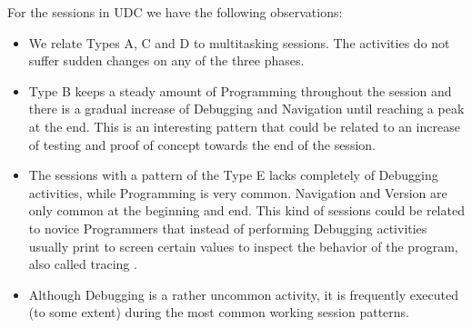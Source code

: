 \documentclass[conference]{IEEEtran}
\begin{document}
For the sessions in UDC we have the following observations:
\begin{itemize}
	\item We relate Types A, C and D to multitasking sessions. The activities do not suffer sudden changes on any of the three phases.
	
	\item Type B keeps a steady amount of Programming throughout the session and there is a gradual increase of Debugging and Navigation until reaching a peak at the end. This is an interesting pattern that could be related to an increase of testing and proof of concept towards the end of the session.
	
	\item The sessions with a pattern of the Type E lacks completely of Debugging activities, while Programming is very common. Navigation and Version are only common at the beginning and end. This kind of sessions could be related to novice Programmers that instead of performing Debugging activities usually print to screen certain values to inspect the behavior of the program, also called tracing \cite{MKM08, AEH05}.
	
	\item Although Debugging is a rather uncommon activity, it is frequently executed (to some extent) during the most common working session patterns.
\end{itemize}
\end{document}
